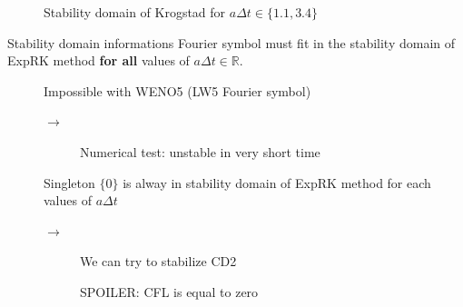 \documentclass{beamer}
\newcommand{\cmark}{{\color{dgreen}\ding{52}}}%
\newcommand{\xmark}{{\color{red}\ding{55}}}%
\begin{document}
\begin{frame}{}
{\begin{figure}
      \caption{Stability domain of Krogstad for $a\Delta t\in\{1.1, 3.4\}$}
    \end{figure}
  }
\end{frame}
\begin{frame}{Stability domain informations}
  Fourier symbol must fit in the stability domain of ExpRK method \textbf{for all} values of $a\Delta t\in\mathbb{R}$.
  \begin{description}
    \item[\xmark] Impossible with WENO5 (LW5 Fourier symbol) \begin{description}\item[$\rightarrow$] Numerical test: unstable in very short time\end{description}
    \item[\cmark] Singleton $\{0\}$ is alway in stability domain of ExpRK method for each values of $a\Delta t$
      \begin{description}
        \item[$\rightarrow$] We can try to stabilize CD2
        \item[\xmark] SPOILER: CFL is equal to zero
      \end{description}
  \end{description}
\end{frame}
\end{document}
